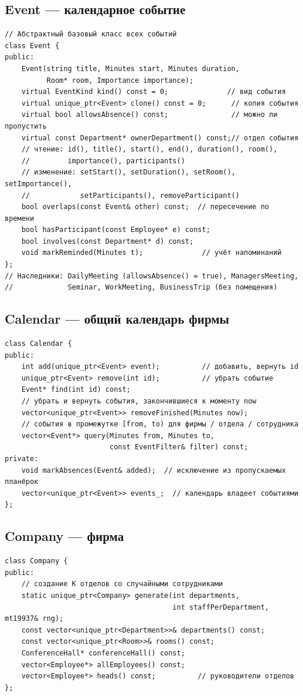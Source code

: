 \documentclass[12pt,a4paper]{article}
\begin{document}
\subsection*{Event --- календарное событие}
\begin{Verbatim}
// Абстрактный базовый класс всех событий
class Event {
public:
    Event(string title, Minutes start, Minutes duration,
          Room* room, Importance importance);
    virtual EventKind kind() const = 0;              // вид события
    virtual unique_ptr<Event> clone() const = 0;      // копия события
    virtual bool allowsAbsence() const;               // можно ли пропустить
    virtual const Department* ownerDepartment() const;// отдел события
    // чтение: id(), title(), start(), end(), duration(), room(),
    //         importance(), participants()
    // изменение: setStart(), setDuration(), setRoom(), setImportance(),
    //            setParticipants(), removeParticipant()
    bool overlaps(const Event& other) const;  // пересечение по времени
    bool hasParticipant(const Employee* e) const;
    bool involves(const Department* d) const;
    void markReminded(Minutes t);              // учёт напоминаний
};
// Наследники: DailyMeeting (allowsAbsence() = true), ManagersMeeting,
//             Seminar, WorkMeeting, BusinessTrip (без помещения)
\end{Verbatim}

\subsection*{Calendar --- общий календарь фирмы}
\begin{Verbatim}
class Calendar {
public:
    int add(unique_ptr<Event> event);          // добавить, вернуть id
    unique_ptr<Event> remove(int id);          // убрать событие
    Event* find(int id) const;
    // убрать и вернуть события, закончившиеся к моменту now
    vector<unique_ptr<Event>> removeFinished(Minutes now);
    // события в промежутке [from, to) для фирмы / отдела / сотрудника
    vector<Event*> query(Minutes from, Minutes to,
                         const EventFilter& filter) const;
private:
    void markAbsences(Event& added);  // исключение из пропускаемых планёрок
    vector<unique_ptr<Event>> events_;  // календарь владеет событиями
};
\end{Verbatim}

\subsection*{Company --- фирма}
\begin{Verbatim}
class Company {
public:
    // создание K отделов со случайными сотрудниками
    static unique_ptr<Company> generate(int departments,
                                        int staffPerDepartment, mt19937& rng);
    const vector<unique_ptr<Department>>& departments() const;
    const vector<unique_ptr<Room>>& rooms() const;
    ConferenceHall* conferenceHall() const;
    vector<Employee*> allEmployees() const;
    vector<Employee*> heads() const;          // руководители отделов
};
\end{Verbatim}
\end{document}
